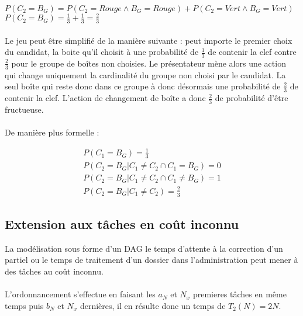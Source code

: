\documentclass[11pt]{article}
\begin{document}
\paragraph{}
$P(C_2=B_G) = P(C_2=Rouge \wedge B_G=Rouge) + P(C_2=Vert \wedge B_G=Vert)$ \\
$P(C_2=B_G) = \frac{1}{3} + \frac{1}{3} = \frac{2}{3}$

\paragraph{}
Le jeu peut être simplifié de la manière suivante : peut importe le premier choix du candidat, la boite qu'il choisit à une probabilité de $\frac{1}{3}$ de contenir la clef contre $\frac{2}{3}$ pour le groupe de boîtes non choisies. Le présentateur mène alors une action qui change uniquement la cardinalité du groupe non choisi par le candidat. La seul boîte qui reste donc dans ce groupe à donc désormais une probabilité de $\frac{2}{3}$ de contenir la clef. L'action de changement de boîte a donc $\frac{2}{3}$ de probabilité d'être fructueuse.

\paragraph{}
De manière plus formelle :

\begin{gather}
  P(C_1=B_G) = \frac{1}{3} \\
  P(C_2=B_G|C_1 \neq C_2 \cap C_1 = B_G) = 0 \\
  P(C_2=B_G|C_1 \neq C_2 \cap C_1 \neq B_G) = 1 \\
  P(C_2=B_G|C_1 \neq C_2) = \frac{2}{3}
\end{gather}


\subsection{Extension aux tâches en coût inconnu}
La modélisation sous forme d'un DAG le temps d'attente à la correction d'un partiel ou le temps de traitement d'un dossier dans l'administration peut mener à des tâches au coût inconnu. 

\paragraph{}
L'ordonnancement s'effectue en faisant les $a_N$ et $N_x$ premieres tâches en même temps puis $b_N$ et $N_x$ dernières, il en résulte donc un temps de $T_2(N) = 2N$.
\end{document}

